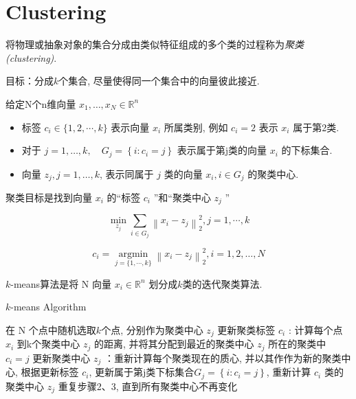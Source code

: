 \section{Clustering}

将物理或抽象对象的集合分成由类似特征组成的多个类的过程称为\textit{聚类(clustering)}.



目标：分成$k$个集合, 尽量使得同一个集合中的向量彼此接近. 

\begin{notation}
    给定N个n维向量 $ x_{1}, \ldots, x_{N} \in \mathbb{R}^{n} $

    \begin{itemize}
        \item 标签 $ c_{i} \in\{1,2, \cdots, k\} $ 表示向量 $ x_{i} $ 所属类别, 例如 $ c_{i}=2 $ 表示 $ x_{i} $ 属于第2类. 
        \item 对于 $ j=1, \ldots, k, \quad G_{j}=\left\{i: c_{i}=j\right\} $ 表示属于第j类的向量 $ x_{i} $ 的下标集合. 
        \item 向量 $ z_{j}, j=1, \ldots, k $, 表示同属于 $ j $ 类的向量 $ x_{i}, i \in G_{j} $ 的聚类中心. 
    \end{itemize}
\end{notation}

聚类目标是找到向量 $ x_{i} $ 的“标签 $ c_{i} $ ”和“聚类中心 $ z_{j} $ ”

\begin{problem}
    $$ \min _{z_{j}} \sum_{i \in G_{j}}\left\|x_{i}-z_{j}\right\|_{2}^{2}, j=1, \cdots, k $$

    $$ c_{i}=\underset{j=\{1, \cdots, k\}}{\operatorname{argmin}}\left\|x_{i}-z_{j}\right\|_{2}^{2}, i=1,2, \ldots, N $$

    
\end{problem}

$k$-means算法是将 $ \mathrm{N} $ 向量 $ x_{i} \in \mathbb{R}^{n} $ 划分成$k$类的迭代聚类算法. 

\begin{algorithm}
    \caption{$k$-means Algorithm}
    在 $ \mathrm{N} $ 个点中随机选取$k$个点, 分别作为聚类中心 $ z_{j} $\;
    更新聚类标签 $ c_{i} $ : 计算每个点 $ x_{i} $ 到k个聚类中心 $ z_{j} $ 的距离, 并将其分配到最近的聚类中心 $ z_{j} $ 所在的聚类中 $ c_{i}=j $\;
    更新聚类中心 $ z_{j} $ ：重新计算每个聚类现在的质心, 并以其作作为新的聚类中心, 根据更新标签 $ c_{i} $, 更新属于第j类下标集合$ G_{j}=\left\{i: c_{i}=j\right\} $, 重新计算 $ c_{i} $ 类的聚类中心 $ z_{j} $\;
    重复步骤2、3, 直到所有聚类中心不再变化
\end{algorithm}

